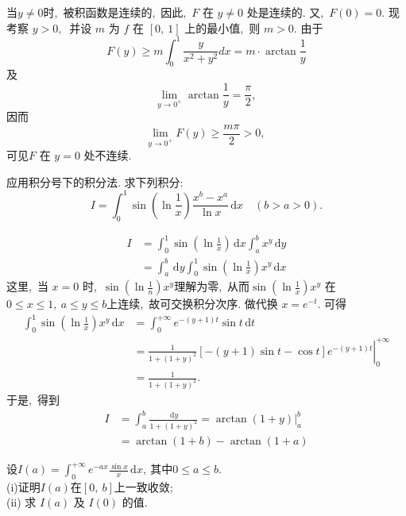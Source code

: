 	\begin{solution}
		当$  y \neq 0  $时,\  被积函数是连续的,\  因此,\  $ F$  在 $ y \neq 0$  处是连续的.
		又,\  $ F(0)=0 .$ 现考察  $y>0 ,\ $ 并设 $ m$  为 $ f$  在 $ [0,\ 1]$  上的最小值,\  则 $ m>0 .$ 由于
		$$F(y) \geqslant m \int_{0}^{1} \frac{y}{x^{2}+y^{2}} d x=m \cdot \arctan \frac{1}{y}$$
		及
		$$\lim\limits_{y \rightarrow 0^+} \arctan \frac{1}{y}=\frac{\pi}{2} \text {,\  }$$
		因而
		$$\lim\limits_{y\rightarrow 0^{+}}F(y)\ge\frac{m\pi}{2}>0,\ $$
		可见$  F$  在 $ y=0$  处不连续. 
	\end{solution}
	\newpage
	\begin{problem}
		应用积分号下的积分法. 求下列积分:
		$$I=\int_{0}^{1} \sin \left(\ln \frac{1}{x}\right) \frac{x^{b}-x^{a}}{\ln x} \,\text{d} x \quad(b>a>0) .$$
	\end{problem}
	
	\begin{solution}
		$$\begin{aligned}
			I &=\int_{0}^{1} \sin \left(\ln \frac{1}{x}\right) \,\text{d} x \int_{a}^{b} x^{y} \,\text{d} y \\
			&=\int_{a}^{b} \,\text{d} y \int_{0}^{1} \sin \left(\ln \frac{1}{x}\right) x^{y} \,\text{d} x
		\end{aligned}$$
		这里,\  当 $ x=0 $ 时,\ $  \sin \left(\ln \frac{1}{n}\right) x^{y}  $理解为零,\  从而$  \sin \left(\ln \frac{1}{x}\right) x^{y}$  在$  0 \leqslant x \leqslant 1,\  a \leqslant y \leqslant b $上连续,\  故可交换积分次序.
		做代换  $x=e^{-t} .$ 可得
		$$\begin{aligned}
			\int_{0}^{1} \sin \left(\ln \frac{1}{x}\right) x^{y} \,\text{d} x &=\int_{0}^{+\infty} e^{-(y+1) t} \sin t \,\text{d} t \\
			&=\left.\frac{1}{1+(1+y)^{2}}[-(y+1) \sin t-\cos t] e^{-(y+1) t}\right|_{0} ^{+\infty} \\
			&=\frac{1}{1+(1+y)^{2}} .
		\end{aligned}$$
		于是,\  得到
		$$\begin{aligned}
			I &=\int_{a}^{b} \frac{\,\text{d} y}{1+(1+y)^{2}}=\left.\arctan (1+y)\right|_{a} ^{b} \\
			&=\arctan (1+b)-\arctan (1+a)
		\end{aligned}$$ 
	\end{solution}
	\newpage
	\begin{problem}
		设$I(a)=\int_{0}^{+\infty}e^{-ax}\frac{\sin x}{x}\,\text{d}x,\ $其中$0\leqslant a\leqslant b.$\\
		(i)证明$I(a)$在$\left[0,\ b\right]$上一致收敛;\\
		(ii) 求 $ I(a) $ 及 $ I(0) $ 的值.
	\end{problem}
	
